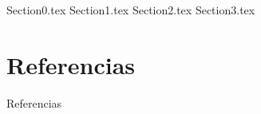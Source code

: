\documentclass[aspectratio=169, handout]{beamer}
\begin{document}
\maketitlepage %

\maketableofcontents %
\makesubsectionpopup %

{Section0.tex}
{Section1.tex}
{Section2.tex}
{Section3.tex}

\section{Referencias}
\begin{frame}{Referencias}
    \printbibliography%
\end{frame}
\end{document}
